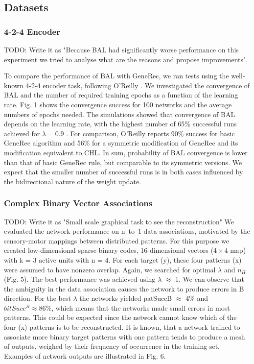 
\subsection{Datasets}  

\subsubsection{4-2-4 Encoder} 
\label{sec:datasets-auto4}

TODO: Write it as "Because BAL had significantly worse performance on this experiment we tried to analyse what are the reasons and propose improvements". 

To compare the performance of BAL with GeneRec, we ran tests using the well-
known 4-2-4 encoder task, following O’Reilly \citet{o1996bio}. We investigated the convergence
of BAL and the number of required training epochs as a function of the learning
rate. Fig. 1 shows the convergence success for 100 networks and the average
numbers of epochs needed. The simulations showed that convergence of BAL
depends on the learning rate, with the highest number of 65\% successful runs
achieved for $\lambda = 0.9$ \citet{farkas2013bal}. For comparison, O’Reilly \citet{o1996bio} reports 90\% success for basic GeneRec algorithm and 56\% for a symmetric modification of GeneRec and its
modification equivalent to CHL. In sum, probability of BAL convergence is lower
than that of basic GeneRec rule, but comparable to its symmetric versions. We
expect that the smaller number of successful runs is in both cases influenced by
the bidirectional nature of the weight update.

\subsubsection{Complex Binary Vector Associations} 
\label{sec:datasets-k3}

TODO: Write it as "Small scale graphical task to see the reconstruction" 
We evaluated the network performance on n–to–1 data associations, motivated
by the sensory-motor mappings between distributed patterns. For this purpose
we created low-dimensional sparse binary codes, 16-dimensional vectors ($4 \times 4$
map) with k = 3 active units with n = 4. For each target (y), these four
patterns (x) were assumed to have nonzero overlap. Again, we searched for
optimal $\lambda$ and $n_H$ (Fig. 5). The best performance was achieved using $\lambda$ $\approx$ 1. We
can observe that the ambiguity in the data association causes the network to
produce errors in B direction. For the best $\lambda$ the networks yielded patSuccB $\approx$
4\% and $bitSucc^B \approx 86\%$, which means that the networks made small errors in
most patterns. This could be expected since the network cannot know which of
the four (x) patterns is to be reconstructed. It is known, that a network trained
to associate more binary target patterns with one pattern tends to produce a
mesh of outputs, weighed by their frequency of occurrence in the training set.
Examples of network outputs are illustrated in Fig. 6.

